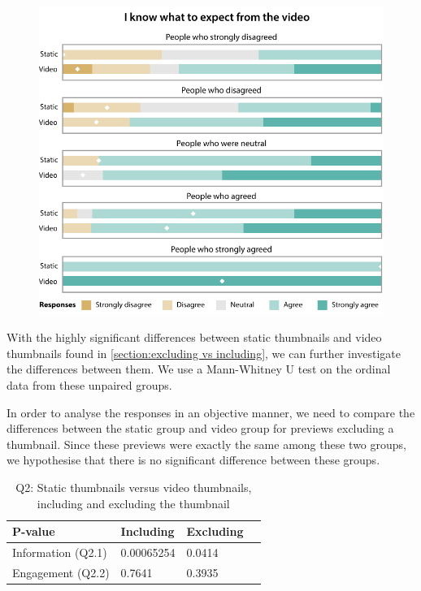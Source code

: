 \documentclass{../resources/sig-alternate-05-2015}
\begin{document}
\begin{figure}[h]
	\label{static versus video}
	\includegraphics[width=\linewidth]{resources/information_static_video}
\end{figure}

With the highly significant differences between static thumbnails and video thumbnails found in \ref{section:excluding vs including}, we can further investigate the differences between them. We use a Mann-Whitney U test on the ordinal data from these unpaired groups.

In order to analyse the responses in an objective manner, we need to compare the differences between the static group and video group for previews excluding a thumbnail. Since these previews were exactly the same among these two groups, we hypothesise that there is no significant difference between these groups.

\begin{table}[h]
\centering
\caption{Q2: Static thumbnails versus video thumbnails, including and excluding the thumbnail}
\label{table: q2 significance}
\begin{tabular}{@{}llll@{}}
\textbf{P-value}   & \textbf{Including} & \textbf{Excluding} \\ \hline
Information (Q2.1) & \num{0.00065254}   & 0.0414             \\
Engagement (Q2.2)  & 0.7641             & 0.3935
\end{tabular}
\end{table}
\end{document}
